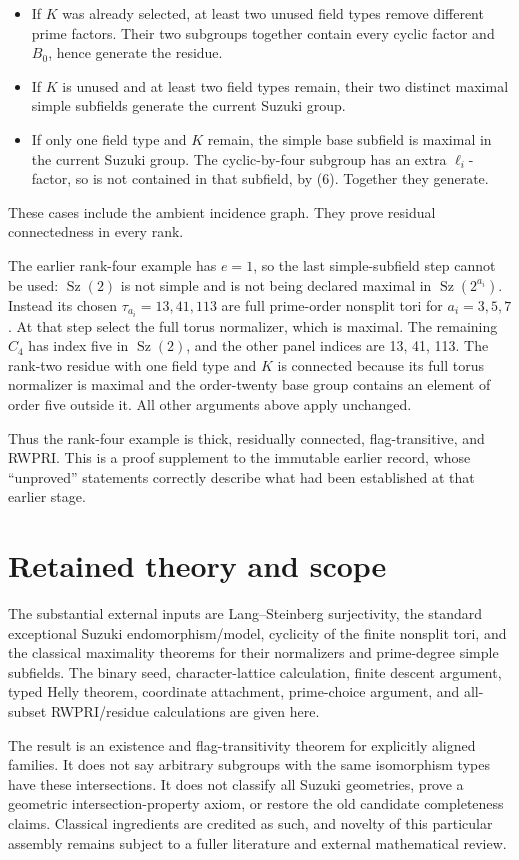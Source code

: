 \documentclass[11pt,a4paper]{article}
\providecommand{\tightlist}{\setlength{\itemsep}{0pt}\setlength{\parskip}{0pt}}
\begin{document}
\begin{itemize}
\tightlist
\item
  If \(K\) was already selected, at least two unused field types remove
  different prime factors. Their two subgroups together contain every
  cyclic factor and \(B_0\), hence generate the residue.
\item
  If \(K\) is unused and at least two field types remain, their two
  distinct maximal simple subfields generate the current Suzuki group.
\item
  If only one field type and \(K\) remain, the simple base subfield is
  maximal in the current Suzuki group. The cyclic-by-four subgroup has
  an extra \(\ell_i\)-factor, so is not contained in that subfield, by
  (6). Together they generate.
\end{itemize}

These cases include the ambient incidence graph. They prove residual
connectedness in every rank.

The earlier rank-four example has \(e=1\), so the last simple-subfield
step cannot be used: \(\operatorname{Sz}(2)\) is not simple and is not
being declared maximal in \(\operatorname{Sz}(2^{a_i})\). Instead its
chosen \(\tau_{a_i}=13,41,113\) are full prime-order nonsplit tori for
\(a_i=3,5,7\). At that step select the full torus normalizer, which is
maximal. The remaining \(C_4\) has index five in
\(\operatorname{Sz}(2)\), and the other panel indices are 13, 41, 113.
The rank-two residue with one field type and \(K\) is connected because
its full torus normalizer is maximal and the order-twenty base group
contains an element of order five outside it. All other arguments above
apply unchanged.

Thus the rank-four example is thick, residually connected,
flag-transitive, and RWPRI. This is a proof supplement to the immutable
earlier record, whose ``unproved'' statements correctly describe what
had been established at that earlier stage.

\section{Retained theory and
scope}\label{retained-theory-and-scope}

The substantial external inputs are Lang--Steinberg surjectivity, the
standard exceptional Suzuki endomorphism/model, cyclicity of the finite
nonsplit tori, and the classical maximality theorems for their
normalizers and prime-degree simple subfields. The binary seed,
character-lattice calculation, finite descent argument, typed Helly
theorem, coordinate attachment, prime-choice argument, and all-subset
RWPRI/residue calculations are given here.

The result is an existence and flag-transitivity theorem for explicitly
aligned families. It does not say arbitrary subgroups with the same
isomorphism types have these intersections. It does not classify all
Suzuki geometries, prove a geometric intersection-property axiom, or
restore the old candidate completeness claims. Classical ingredients are
credited as such, and novelty of this particular assembly remains
subject to a fuller literature and external mathematical review.
\end{document}
